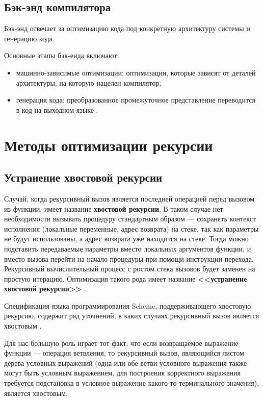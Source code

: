 \subsection{Бэк-энд компилятора}\label{sec:ch1/sec5/subsec6}

Бэк-энд отвечает за оптимизацию кода под конкретную архитектуру системы
и генерацию кода. 

Основные этапы бэк-енда включают: 

\begin{itemize}
    \item машинно-зависимые оптимизации:
    оптимизации, которые зависят от деталей архитектуры, 
    на которую нацелен компилятор;
    \item генерация кода:
    преобразованное промежуточное представление переводится в код
    на выходном языке \cite[с.~619]{dragonbook}.
\end{itemize}

\section{Методы оптимизации рекурсии}\label{sec:ch1/sec7}

\subsection{Устранение хвостовой рекурсии}\label{sec:ch1/sec7/subsec1}

Случай, когда рекурсивный вызов является последней операцией перед
вызовом из функции, имеет название \textbf{хвостовой рекурсии}.
В таком случае нет необходимости вызывать процедуру стандартным образом
--- сохранять контекст исполнения (локальные переменные, адрес возврата)
на стеке, так как параметры не будут использованы, а адрес возврата
уже находится на стеке. Тогда можно подставить передаваемые параметры
вместо локальных аргументов функции, и вместо вызова перейти на начало
процедуры при помощи инструкции перехода. Рекурсивный вычислительный
процесс с ростом стека вызовов будет заменен на простую итерацию.
Оптимизация такого рода имеет название \textbf{<<устранение хвостовой
рекурсии>>} \cite[с.~508]{sicp}.

Спецификация языка программирования Scheme, поддерживающего
хвостовую рекурсию, содержит ряд уточнений, в каких случаях рекурсивный
вызов является хвостовым \cite[с.~59]{r6rs}.

Для нас большую роль играет тот факт, что если возвращаемое
выражение функции --- операция ветвления, то рекурсивный вызов,
являющийся листом дерева условных выражений
(одна или обе ветви условного выражения также могут быть условным
выражением, для построения корректного выражения требуется
подстановка в условное выражение какого-то терминального значения),
является хвостовым.

